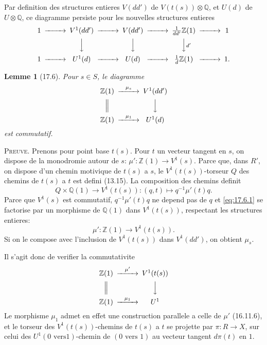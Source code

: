 \documentclass[12pt,a4paper]{article}
\theoremstyle{plain}
\newtheorem{lemma}[theorem]{Lemme}
\theoremstyle{definition}
\theoremstyle{remark}
\newcommand{\ZZ}{\mathbb{Z}}
\newcommand{\QQ}{\mathbb{Q}}
\begin{document}
Par definition des structures entieres $V(dd')$ de
$V(t(s)) \otimes \QQ$, et $U(d)$ de $U \otimes \QQ$, ce diagramme
persiste pour les nouvelles structures entieres
\begin{equation}\label{eq:17.5.1}
\begin{CD}
1 @>>> V^1(dd') @>>> V(dd') @>>> \frac{1}{dd'}\ZZ(1) @>>> 1 \\
@. @VVV @VVV @VV{d'}V \\
1 @>>> U^1(d) @>>> U(d) @>>> \frac{1}{d}\ZZ(1) @>>> 1.
\end{CD}
\end{equation}

\begin{lemma}[17.6]\label{lem:17.6}
Pour $s \in S$, le diagramme
\[
\begin{CD}
\ZZ(1) @>{\mu_s}>> V^1(dd') \\
@| @VVV \\
\ZZ(1) @>{\mu_1}>> U^1(d)
\end{CD}
\]
est commutatif.
\end{lemma}

\noindent \textsc{Preuve.} Prenons pour point base $t(s)$. Pour $t$ un
vecteur tangent en $s$, on dispose de la monodromie autour de $s$:
$\mu' : \ZZ(1) \to V^1(s)$. Parce que, dans $R'$, on dispose d'un
chemin motivique de $t(s)$ a $s$, le $V^1(t(s))$-torseur $Q$ des
chemins de $t(s)$ a $t$ est defini (13.15). La composition des
chemins definit
\begin{equation}\label{eq:17.6.1}
Q \times \QQ(1) \to V^1(t(s)) : (q,t) \mapsto q^{-1}\mu'(t)q.
\end{equation}
Parce que $V^1(s)$ est commutatif, $q^{-1}\mu'(t)q$ ne depend pas de
$q$ et \eqref{eq:17.6.1} se factorise par un morphisme de $\QQ(1)$
dans $V^1(t(s))$, respectant les structures entieres:
\[
\mu' : \ZZ(1) \to V^1(t(s)).
\]
Si on le compose avec l'inclusion de $V^1(t(s))$ dans $V^1(dd')$, on
obtient $\mu_s$.

Il s'agit donc de verifier la commutativite
\[
\begin{CD}
\ZZ(1) @>{\mu'}>> V^1(t(s)) \\
@| @VVV \\
\ZZ(1) @>{\mu_1}>> U^1
\end{CD}
\]
Le morphisme $\mu_1$ admet en effet une construction parallele a celle
de $\mu'$ (16.11.6), et le torseur des $V^1(t(s))$-chemins de $t(s)$ a
$t$ se projette par $\pi : R \to X$, sur celui des $U^1(0 \text{ vers
} 1)$-chemin de $(0 \text{ vers } 1)$ au vecteur tangent $d\pi(t)$ en
$1$.
\end{document}
